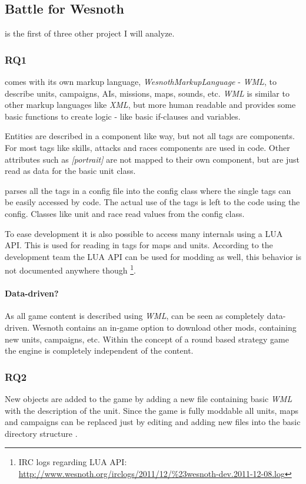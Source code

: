 \subsection{Battle for Wesnoth}
\BOW{} is the first of three other \OS{} project I will analyze.

\subsubsection{RQ1}
\BOW{} comes with its own markup language, \textit{WesnothMarkupLanguage} - \textit{WML}, to describe units, campaigns, AIs,
missions, maps, sounds, etc. \textit{WML} is similar to other markup languages like \textit{XML}, but more human readable and provides some basic functions to create logic - like basic if-clauses and variables. 

Entities are described in a component like way, but not all tags are components. For most tags like skills,
attacks and races components are used in code. Other attributes such as \textit{[portrait]} are not mapped to their own
component, but are just read as data for the basic unit class. 

\BOW{} parses all the tags in a config file into the config class where the single tags can be easily accessed by code.
The actual use of the tags is left to the code using the config. Classes like unit and race read values from the config
class.

To ease development it is also possible to access many internals using a LUA API. This is used for reading in
tags for maps and units. According to the development team the LUA API can be used for modding as well, this behavior
is not documented anywhere though \footnote{IRC logs regarding LUA API: \url{http://www.wesnoth.org/irclogs/2011/12/\%23wesnoth-dev.2011-12-08.log}}.

\paragraph{Data-driven?}
As all game content is described using \textit{WML}, \BOW{} can be seen as completely data-driven. Wesnoth contains an in-game option
to download other mods, containing new units, campaigns, etc. Within the concept of a round based strategy game the
engine is completely independent of the content.

\subsubsection{RQ2}
New objects are added to the game by adding a new file containing basic \textit{WML} with the description of the unit.
Since the game is fully moddable all units, maps and campaigns can be replaced just by editing and adding new files into
the basic directory structure \cite{wesnothaddunit}.

